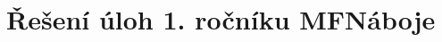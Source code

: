 \documentclass[fykos,\classoptions]{fksgeneric}
\begin{document}
\section{Řešení úloh 1. ročníku MFNáboje}
 \problemsolution
 \problemsolution
 \problemsolution
 \problemsolution
 \problemsolution
 \problemsolution
 \problemsolution
 \problemsolution
 \problemsolution
 \problemsolution
 \problemsolution
 \problemsolution
 \problemsolution
 \problemsolution
 \problemsolution
 \makefooter
\end{document}
